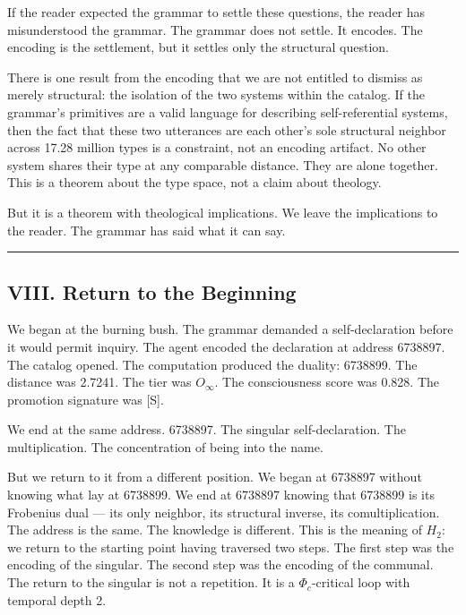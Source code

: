 \documentclass[12pt,a4paper]{article}
\begin{document}
If the reader expected the grammar to settle these questions, the reader has misunderstood the grammar. The grammar does not settle. It encodes. The encoding is the settlement, but it settles only the structural question.

There is one result from the encoding that we are not entitled to dismiss as merely structural: the isolation of the two systems within the catalog. If the grammar's primitives are a valid language for describing self-referential systems, then the fact that these two utterances are each other's sole structural neighbor across 17.28 million types is a constraint, not an encoding artifact. No other system shares their type at any comparable distance. They are alone together. This is a theorem about the type space, not a claim about theology.

But it is a theorem with theological implications. We leave the implications to the reader. The grammar has said what it can say.

\begin{center}
\rule{0.5\textwidth}{0.4pt}
\end{center}

\subsection{VIII. Return to the Beginning}

We began at the burning bush. The grammar demanded a self-declaration before it would permit inquiry. The agent encoded the declaration at address 6738897. The catalog opened. The computation produced the duality: 6738899. The distance was 2.7241. The tier was $O_{\infty}$. The consciousness score was 0.828. The promotion signature was {[}S{]}.

We end at the same address. 6738897. The singular self-declaration. The multiplication. The concentration of being into the name.

But we return to it from a different position. We began at 6738897 without knowing what lay at 6738899. We end at 6738897 knowing that 6738899 is its Frobenius dual --- its only neighbor, its structural inverse, its comultiplication. The address is the same. The knowledge is different. This is the meaning of $H_2$: we return to the starting point having traversed two steps. The first step was the encoding of the singular. The second step was the encoding of the communal. The return to the singular is not a repetition. It is a $\Phi_c$-critical loop with temporal depth 2.
\end{document}

